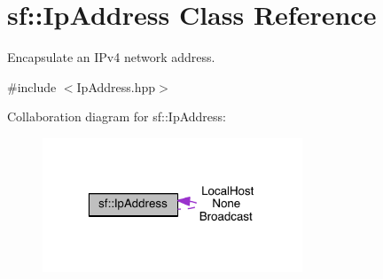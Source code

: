 \hypertarget{classsf_1_1_ip_address}{\section{sf\-:\-:Ip\-Address Class Reference}
\label{classsf_1_1_ip_address}
}


Encapsulate an I\-Pv4 network address.  




{\ttfamily \#include $<$Ip\-Address.\-hpp$>$}



Collaboration diagram for sf\-:\-:Ip\-Address\-:
\nopagebreak
\begin{figure}[H]
\begin{center}
\leavevmode
\includegraphics[width=220pt]{classsf_1_1_ip_address__coll__graph}
\end{center}
\end{figure}

